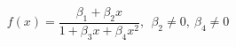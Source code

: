 

\[
f(x) = \frac{\beta_1 + \beta_2x}{1 + \beta_3x + \beta_4x^2}, \ \ \beta_2 \neq 0, \ \beta_4 \neq 0
\]


